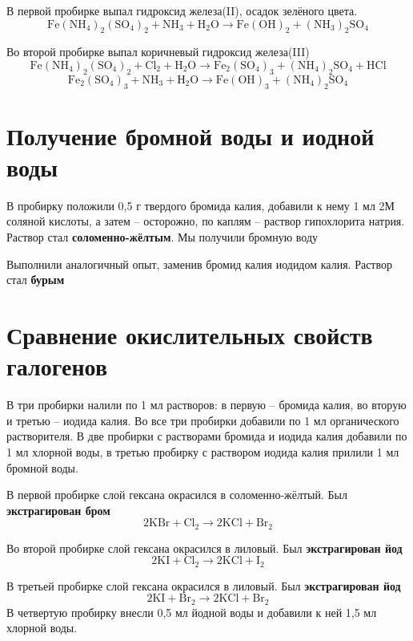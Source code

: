 \documentclass[a4paper,12pt]{article}
\begin{document}
В первой пробирке выпал гидроксид железа(II), осадок зелёного цвета.
\begin{equation} 
\mathrm{Fe(NH_4)_2(SO_4)_2 + NH_3 + H_2O \longrightarrow Fe(OH)_2 + (NH_3)_2SO_4} 
\end{equation}

Во второй пробирке выпал коричневый гидроксид железа(III)
\begin{equation} 
\mathrm{Fe(NH_4)_2(SO_4)_2 + Cl_2+H_2O \longrightarrow Fe_2(SO_4)_3+(NH_4)_2SO_4+HCl} 
\end{equation}
\begin{equation} 
\mathrm{Fe_2(SO_4)_3 + NH_3 + Н_2O \longrightarrow Fe(OH)_3+(NH_4)_2SO_4} 
\end{equation}

\section{Получение бромной воды и иодной воды}
В пробирку положили 0,5 г твердого бромида калия, добавили к нему 1 мл 2М соляной
кислоты, а затем – осторожно, по каплям – раствор гипохлорита натрия. Раствор стал \textbf{соломенно-жёлтым}. Мы получили бромную воду


Выполнили аналогичный опыт, заменив бромид калия иодидом калия. Раствор стал \textbf{бурым} 
\section{Сравнение окислительных свойств галогенов}
В три пробирки налили по 1 мл растворов: в первую – бромида калия, во вторую и третью –
иодида калия. Во все три пробирки добавили по 1 мл органического растворителя. В две пробирки
с растворами бромида и иодида калия добавили по 1 мл хлорной воды, в третью пробирку с
раствором иодида калия прилили 1 мл бромной воды. 

 
В первой пробирке слой гексана окрасился в соломенно-жёлтый. Был \textbf{экстрагирован бром}
\begin{equation} 
\mathrm{2KBr+ Cl_2  \longrightarrow 2KCl + Br_2} 
\end{equation}


 
Во второй пробирке слой гексана окрасился в лиловый. Был \textbf{экстрагирован йод}
\begin{equation} 
\mathrm{2KI+ Cl_2  \longrightarrow 2KCl + I_2} 
\end{equation}


В третьей пробирке слой гексана окрасился в лиловый. Был \textbf{экстрагирован йод}
\begin{equation} 
\mathrm{2KI+ Br_2  \longrightarrow 2KCl + Br_2} 
\end{equation}
В четвертую пробирку внесли 0,5 мл йодной воды и добавили к ней 1,5 мл хлорной воды.
\end{document}
